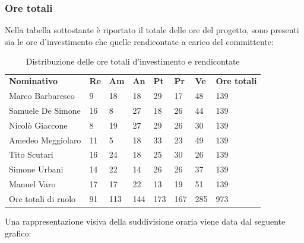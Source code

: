 \subsubsection{Ore totali}
Nella tabella sottostante è riportato il totale delle ore del progetto, sono presenti sia le ore d'investimento che quelle rendicontate a carico del committente:
\begin{center}
    \begin{table}[ht!]
        \centering\caption{Distribuzione delle ore totali d'investimento e rendicontate}
        \vspace{5px}
        \renewcommand{\arraystretch}{1.8}
        \begin{tabular}{p{100px} p{20px} p{20px} p{20px} p{20px} p{20px} p{20px} p{50px} }
            \rowcolor{logo!70} \textbf{Nominativo} & \textbf{Re} & \textbf{Am} & \textbf{An} & \textbf{Pt} & \textbf{Pr} & \textbf{Ve} & \textbf{Ore totali} \\
            Marco Barbaresco                       & 9           & 18          & 18          & 29          & 17          & 48          & 139                 \\
            Samuele De Simone                      & 16          & 8           & 27          & 18          & 26          & 44          & 139                 \\
            Nicolò Giaccone                        & 8           & 19          & 27          & 29          & 26          & 30          & 139                 \\
            Amedeo Meggiolaro                      & 11          & 5           & 18          & 33          & 23          & 49          & 139                 \\
            Tito Scutari                           & 16          & 24          & 18          & 25          & 30          & 26          & 139                 \\
            Simone Urbani                          & 14          & 22          & 14          & 26          & 26          & 37          & 139                 \\
            Manuel Varo                            & 17          & 17          & 22          & 13          & 19          & 51          & 139                 \\
            Ore totali di ruolo                    & 91          & 113         & 144         & 173         & 167         & 285         & 973                 \\
        \end{tabular}
    \end{table}
\end{center}
\pagebreak
Una rappresentazione visiva della suddivisione oraria viene data dal seguente grafico:

